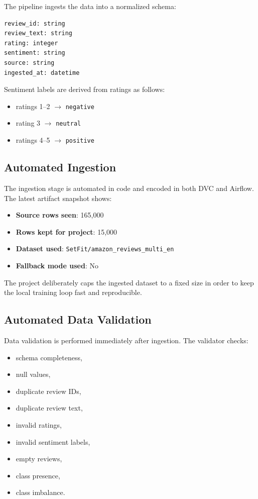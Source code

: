 \documentclass[11pt,a4paper]{article}
\newcommand{\smallmetric}[2]{\textbf{#1}: #2}
\begin{document}
The pipeline ingests the data into a normalized schema:

\begin{lstlisting}
review_id: string
review_text: string
rating: integer
sentiment: string
source: string
ingested_at: datetime
\end{lstlisting}

Sentiment labels are derived from ratings as follows:

\begin{itemize}[leftmargin=1.4em]
  \item ratings 1--2 $\rightarrow$ \texttt{negative}
  \item rating 3 $\rightarrow$ \texttt{neutral}
  \item ratings 4--5 $\rightarrow$ \texttt{positive}
\end{itemize}

\subsection{Automated Ingestion}

The ingestion stage is automated in code and encoded in both DVC and Airflow. The latest artifact snapshot shows:

\begin{itemize}[leftmargin=1.4em]
  \item \smallmetric{Source rows seen}{165{,}000}
  \item \smallmetric{Rows kept for project}{15{,}000}
  \item \smallmetric{Dataset used}{\texttt{SetFit/amazon\_reviews\_multi\_en}}
  \item \smallmetric{Fallback mode used}{No}
\end{itemize}

The project deliberately caps the ingested dataset to a fixed size in order to keep the local training loop fast and reproducible.

\subsection{Automated Data Validation}

Data validation is performed immediately after ingestion. The validator checks:

\begin{itemize}[leftmargin=1.4em]
  \item schema completeness,
  \item null values,
  \item duplicate review IDs,
  \item duplicate review text,
  \item invalid ratings,
  \item invalid sentiment labels,
  \item empty reviews,
  \item class presence,
  \item class imbalance.
\end{itemize}
\end{document}
